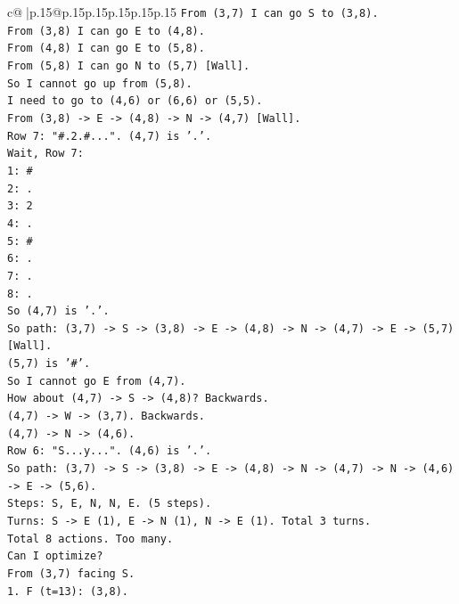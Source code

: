 \documentclass{article}
\begin{document}
{\begin{supertabular}{c@{$\;$}|p{.15\linewidth}@{}p{.15\linewidth}p{.15\linewidth}p{.15\linewidth}p{.15\linewidth}p{.15\linewidth}}
{{{\texttt{From (3,7) I can go S to (3,8).} \\
\texttt{From (3,8) I can go E to (4,8).} \\
\texttt{From (4,8) I can go E to (5,8).} \\
\texttt{From (5,8) I can go N to (5,7) {[}Wall{]}.} \\
\texttt{So I cannot go up from (5,8).} \\
\texttt{I need to go to (4,6) or (6,6) or (5,5).} \\
\texttt{From (3,8) {-}> E {-}> (4,8) {-}> N {-}> (4,7) {[}Wall{]}.} \\
\texttt{Row 7: "\#.2.\#...". (4,7) is '.'.} \\
\texttt{Wait, Row 7:} \\
\texttt{1: \#} \\
\texttt{2: .} \\
\texttt{3: 2} \\
\texttt{4: .} \\
\texttt{5: \#} \\
\texttt{6: .} \\
\texttt{7: .} \\
\texttt{8: .} \\
\texttt{So (4,7) is '.'.} \\
\texttt{So path: (3,7) {-}> S {-}> (3,8) {-}> E {-}> (4,8) {-}> N {-}> (4,7) {-}> E {-}> (5,7) {[}Wall{]}.} \\
\texttt{(5,7) is '\#'.} \\
\texttt{So I cannot go E from (4,7).} \\
\texttt{How about (4,7) {-}> S {-}> (4,8)? Backwards.} \\
\texttt{(4,7) {-}> W {-}> (3,7). Backwards.} \\
\texttt{(4,7) {-}> N {-}> (4,6).} \\
\texttt{Row 6: "S...y...". (4,6) is '.'.} \\
\texttt{So path: (3,7) {-}> S {-}> (3,8) {-}> E {-}> (4,8) {-}> N {-}> (4,7) {-}> N {-}> (4,6) {-}> E {-}> (5,6).} \\
\texttt{Steps: S, E, N, N, E. (5 steps).} \\
\texttt{Turns: S {-}> E (1), E {-}> N (1), N {-}> E (1). Total 3 turns.} \\
\texttt{Total 8 actions. Too many.} \\
\texttt{Can I optimize?} \\
\texttt{From (3,7) facing S.} \\
\texttt{1. F (t=13): (3,8).} \\
}}}
\end{supertabular}}
\end{document}
